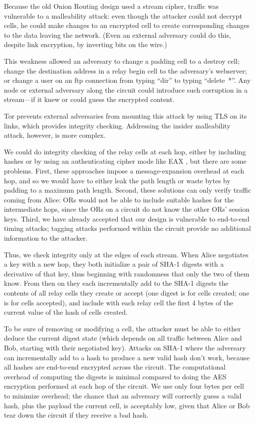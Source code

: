 \documentclass[times,10pt,twocolumn]{article}
\begin{document}
\label{subsec:integrity-checking}

Because the old Onion Routing design used a stream cipher, traffic was
vulnerable to a malleability attack: even though the attacker could not
decrypt cells, he could make changes to an encrypted
cell to create corresponding changes to the data leaving the network.
(Even an external adversary could do this, despite link encryption, by
inverting bits on the wire.)

This weakness allowed an adversary to change a padding cell to a destroy
cell; change the destination address in a relay begin cell to the
adversary's webserver; or change a user on an ftp connection from
typing ``dir'' to typing ``delete~*''. Any node or external adversary
along the circuit could introduce such corruption in a stream---if it
knew or could guess the encrypted content.

Tor prevents external adversaries from mounting this attack by
using TLS on its links, which provides integrity checking.
Addressing the insider malleability attack, however, is
more complex.

We could do integrity checking of the relay cells at each hop, either
by including hashes or by using an authenticating cipher mode like
EAX \cite{eax}, but there are some problems. First, these approaches
impose a message-expansion overhead at each hop, and so we would have to
either leak the path length or waste bytes by padding to a maximum
path length. Second, these solutions can only verify traffic coming
from Alice: ORs would not be able to include suitable hashes for
the intermediate hops, since the ORs on a circuit do not know the
other ORs' session keys. Third, we have already accepted that our design
is vulnerable to end-to-end timing attacks; tagging attacks performed
within the circuit provide no additional information to the attacker.

Thus, we check integrity only at the edges of each stream. When Alice
negotiates a key with a new hop, they both initialize a pair of SHA-1 
digests with a derivative of that key,
thus beginning with randomness that only the two of them know. From
then on they each incrementally add to the SHA-1 digests the contents of 
all relay cells they create or accept (one digest is for cells
created; one is for cells accepted), and include with each relay cell
the first 4 bytes of the current value of the hash of cells created.

To be sure of removing or modifying a cell, the attacker must be able
to either deduce the current digest state (which depends on all
traffic between Alice and Bob, starting with their negotiated key).
Attacks on SHA-1 where the adversary can incrementally add to a hash
to produce a new valid hash don't work, because all hashes are
end-to-end encrypted across the circuit.  The computational overhead
of computing the digests is minimal compared to doing the AES
encryption performed at each hop of the circuit. We use only four
bytes per cell to minimize overhead; the chance that an adversary will
correctly guess a valid hash, plus the payload the current cell, is
acceptably low, given that Alice or Bob tear down the circuit if they
receive a bad hash.
\end{document}
